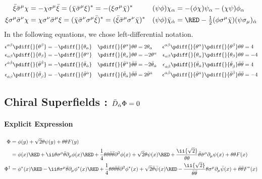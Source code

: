 \vspace{-2.5zw}
\begin{align*}
 \bar\xi\bSm\chi&=-\chi\Sm\bar\xi=(\bar\chi\bSm\xi)^*=-(\xi\Sm\bar\chi)^*&
 (\psi\phi)\chi_\alpha&=-(\phi\chi)\psi_\alpha-(\chi\psi)\phi_\alpha
\\
 \xi\Sm\bSn\chi&=\chi\Sn\bSm\xi=(\bar\chi\bSn\Sm\bar\xi)^*=(\bar\xi\bSm\Sn\bar\chi)^*&
 (\psi\phi)\bar\chi_\dalpha&={\RED-\tfrac12}(\phi\Sm\bar\chi)(\psi\Smd)_\dalpha
\end{align*}
In the following equations, we chose left-differential notation.
\begin{align*}
 \epsilon^{\alpha\beta}\pdiff{}{\theta^\beta}&=-\pdiff{}{\theta_\alpha}&
 \pdiff{}{\theta^\alpha}\thth&=2\theta_\alpha&
 \epsilon^{\alpha\beta}\pdiff{}{\theta^\alpha}\pdiff{}{\theta^\beta}\thth &= 4\\
 \epsilon_{\alpha\beta}\pdiff{}{\theta_\beta}&=-\pdiff{}{\theta^\alpha}&
 \pdiff{}{\theta_\alpha}\thth&=-2\theta^\alpha&
 \epsilon_{\alpha\beta}\pdiff{}{\theta_\alpha}\pdiff{}{\theta_\beta}\thth &= -4\\
 \epsilon^{\dalpha\dbeta}\pdiff{}{\btheta^\dbeta}&=-\pdiff{}{\btheta_\dalpha}&
 \pdiff{}{\btheta^\dalpha}\bthth&=-2\btheta_\dalpha&
 \epsilon_{\dalpha\dbeta}\pdiff{}{\btheta_\dalpha}\pdiff{}{\btheta_\dbeta}\bthth &= 4\\
 \epsilon_{\dalpha\dbeta}\pdiff{}{\btheta_\dbeta}&=-\pdiff{}{\btheta^\dalpha}&
 \pdiff{}{\btheta_\dalpha}\bthth&=2\btheta^\dalpha&
 \epsilon^{\dalpha\dbeta}\pdiff{}{\btheta^\dalpha}\pdiff{}{\btheta^\dbeta}\bthth &= -4
\end{align*}


\newpage
\subsection{Chiral Superfields : $\bar D_{\dot\alpha} \Phi = 0$}
\paragraph{Explicit Expression}
\begin{align}
\Phi
={}& \phi(y) + \sqrt2\theta\psi(y)+\thth F(y)\\
={}& \phi(x){\RED\,+\,} \ii\theta\Sm\btheta\Pm\phi(x)
               {\RED\,+\,} \frac14\thth\bthth\Psq\phi(x)
     + \sqrt2\theta\psi(x){\RED\,+\,}\frac\ii{\sqrt2}\thth\btheta\bSm\Pm\psi(x)
     + \thth F(x)\\
\Phi^\dagger
={}& \phi^*(x){\RED\,-\,} \ii\theta\Sm\btheta\Pm\phi^*(x)
              {\RED\,+\,} \frac14\thth\bthth\Psq\phi^*(x)
   + \sqrt2\btheta\bar\psi(x){\RED\,-\,} \frac\ii{\sqrt2}\bthth\theta\Sm\Pm\bar\psi(x)
   + \bthth F^*(x)
\end{align}

